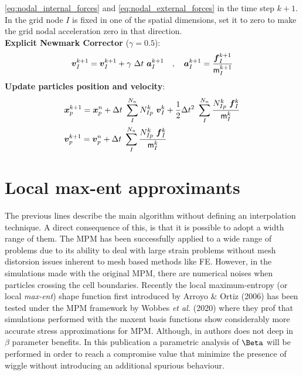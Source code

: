 \begin{algorithm}
\begin{algorithmic}[1]
    \eqref{eq:nodal_internal_forces} and \eqref{eq:nodal_external_forces} in the time step $k+1$. In the
    grid node $I$ is fixed in one of the spatial dimensions, set it to
    zero to make the grid nodal acceleration zero in that direction.\\
    \STATE \textbf{Explicit Newmark Corrector} ($\gamma = 0.5$):
    \begin{equation*}
      \vec{v}_{I}^{k+1} = \vec{v}_{I}^{k+1} + \gamma\ \Delta t\
      \vec{a}_I^{k+1} \quad , \quad  \vec{a}_I^{k+1} = \frac{\vec{f}_{I}^{k+1}}{\tens{m}_I^{k+1}}  
    \end{equation*}
    \STATE \textbf{Update particles position and velocity}:
    \begin{align*}
      &\vec{x}_p^{k+1} = \vec{x}_p^n + \Delta t\
        \sum^{N_n}_{I} N_{Ip}^k\ \vec{v}_{I}^{k} +
        \frac{1}{2}\Delta t^2\ \sum^{N_n}_{I}\frac{N_{Ip}^k\
        \vec{f}_{I}^{k}}{\tens{m}_I^k}\\
      &\vec{v}_p^{k+1} = \vec{v}_p^n + \Delta t\
        \sum^{N_n}_{I}\frac{N_{Ip}^k\
        \vec{f}_{I}^{k}}{\tens{m}_I^k}
    \end{align*}
  \end{algorithmic}
\end{algorithm} 

\section{Local max-ent approximants}
\label{sec:local-max-ent}

The previous lines describe the main algorithm without defining an
interpolation technique. A direct consequence of this, is that it is
possible to adopt a width range of them. The MPM has been
successfully applied to a wide range of problems due to its ability to
deal with large strain problems without mesh distorsion issues inherent to
mesh based methods like FE. However, in the simulations made with the
original MPM, there are numerical noises when particles crossing
the cell boundaries. Recently the local maximum-entropy (or local
\textit{max-ent}) shape function first introduced by Arroyo \& Ortiz
(2006)\cite{Arroyo2006} has been tested under the MPM framework by
Wobbes {\it et al.} (2020)\cite{Wobbes2020} where they prof that
simulations performed with the maxent basis functions show
considerably more accurate stress approximations for MPM. Although, in
\cite{Wobbes2020} authors does not deep in $\beta$ parameter
benefits. In this publication a parametric analysis of $\Beta$ will be
performed in order to reach a compromise value that minimize the
presence of wiggle without introducing an additional spurious behaviour.

